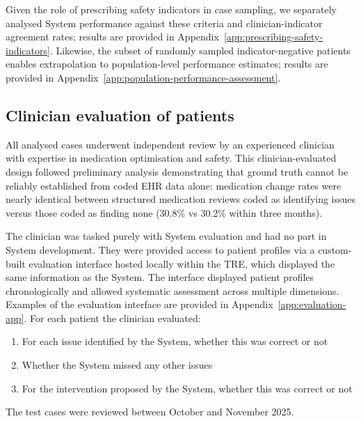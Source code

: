     Given the role of prescribing safety indicators in case sampling, we separately analysed System performance against these criteria and clinician-indicator agreement rates; results are provided in Appendix~\ref{app:prescribing-safety-indicators}. Likewise, the subset of randomly sampled indicator-negative patients enables extrapolation to population-level performance estimates; results are provided in Appendix~\ref{app:population-performance-assessment}.

\subsection{Clinician evaluation of patients}
\label{sec:clinician-evaluation}

    All analysed cases underwent independent review by an experienced clinician with expertise in medication optimisation and safety. This clinician-evaluated design followed preliminary analysis demonstrating that ground truth cannot be reliably established from coded EHR data alone: medication change rates were nearly identical between structured medication reviews coded as identifying issues versus those coded as finding none (30.8\% vs 30.2\% within three months).
    
    The clinician was tasked purely with System evaluation and had no part in System development. They were provided access to patient profiles via a custom-built evaluation interface hosted locally within the TRE, which displayed the same information as the System. The interface displayed patient profiles chronologically and allowed systematic assessment across multiple dimensions. Examples of the evaluation interface are provided in Appendix~\ref{app:evaluation-app}. For each patient the clinician evaluated:

    \begin{enumerate}[nosep]
        \item For each issue identified by the System, whether this was correct or not
        \item Whether the System missed any other issues
        \item For the intervention proposed by the System, whether this was correct or not
    \end{enumerate}
    
    \noindent
    The test cases were reviewed between October and November 2025.

